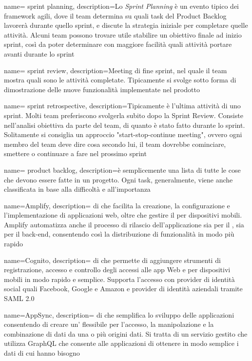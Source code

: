 {
	name= sprint planning,
	description={Lo \emph{Sprint Planning} è un evento tipico dei framework agili, dove il team determina su quali task del Product Backlog lavorerà durante quello sprint, e discute la strategia iniziale per completare quelle attività. Alcuni team possono trovare utile stabilire un obiettivo finale ad inizio sprint, così da poter determinare con maggiore facilità quali attività portare avanti durante lo sprint}
}

{
	name= sprint review,
	description={Meeting di fine sprint, nel quale il team mostra quali sono le attività completate. Tipicamente si svolge sotto forma di dimostrazione delle nuove funzionalità implementate nel prodotto}
}

{
	name= sprint retrospective,
	description={Tipicamente è l'ultima attività di uno sprint. Molti team preferiscono svolgerla subito dopo la Sprint Review. Consiste nell'analisi obiettiva da parte del team, di quanto è stato fatto durante lo sprint. Solitamente si consiglia un approccio "start-stop-continue meeting", ovvero ogni membro del team deve dire cosa secondo lui, il team dovrebbe cominciare, smettere o continuare a fare nel prossimo sprint}
}

{
	name= product backlog,
	description={è semplicemente una lista di tutte le cose che devono essere fatte in un progetto. Ogni task, generalmente, viene anche classificata in base alla difficoltà e all'importanza}
}

{
	name=Amplify,
	description={ di  che facilita la creazione, la configurazione e l’implementazione di applicazioni web, oltre che gestire il  per dispositivi mobili. Amplify automatizza anche il processo di rilascio dell’applicazione sia per il , sia per il back-end, consentendo così la distribuzione di funzionalità in modo più rapido}
}

{
	name=Cognito,
	description={ di  che permette di aggiungere strumenti di registrazione, accesso e controllo degli accessi alle app Web e per dispositivi mobili in modo rapido e semplice. Supporta l'accesso con provider di identità social quali Facebook, Google e Amazon e provider di identità aziendali tramite SAML 2.0}
}

{
	name=AppSync,
	description={ di  che semplifica lo sviluppo delle applicazioni consentendo di creare un' flessibile per l’accesso, la manipolazione e la combinazione di dati da una o più origini dati. Si tratta di un servizio gestito che utilizza GraphQL che consente alle applicazioni di ottenere in modo semplice i dati di cui hanno bisogno}
}

